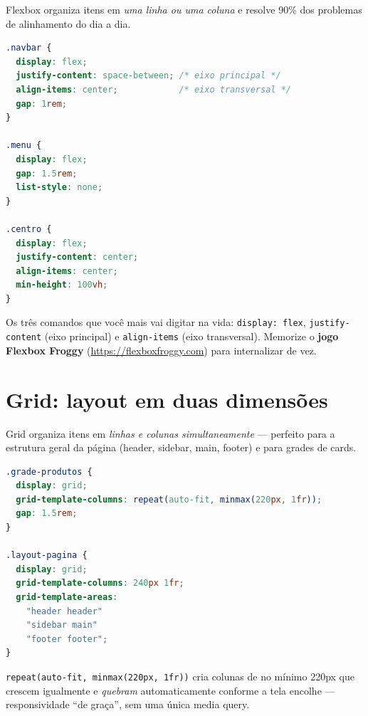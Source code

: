 Flexbox organiza itens em \emph{uma linha ou uma coluna} e resolve 90\% dos
problemas de alinhamento do dia a dia.

\begin{lstlisting}[style=livro, language=CSS,
  caption={Flexbox: centralizar e distribuir.}, label={list:css-flex}]
.navbar {
  display: flex;
  justify-content: space-between; /* eixo principal */
  align-items: center;            /* eixo transversal */
  gap: 1rem;
}

.menu {
  display: flex;
  gap: 1.5rem;
  list-style: none;
}

.centro {
  display: flex;
  justify-content: center;
  align-items: center;
  min-height: 100vh;
}
\end{lstlisting}

\begin{caixadica}
Os três comandos que você mais vai digitar na vida: \texttt{display: flex},
\texttt{justify-content} (eixo principal) e \texttt{align-items} (eixo
transversal). Memorize o \textbf{jogo Flexbox Froggy}
(\url{https://flexboxfroggy.com}) para internalizar de vez.
\end{caixadica}

\section{Grid: layout em duas dimensões}

Grid organiza itens em \emph{linhas e colunas simultaneamente} — perfeito para
a estrutura geral da página (header, sidebar, main, footer) e para grades de
cards.

\begin{lstlisting}[style=livro, language=CSS,
  caption={Grid responsivo sem media query (auto-fit + minmax).},
  label={list:css-grid}]
.grade-produtos {
  display: grid;
  grid-template-columns: repeat(auto-fit, minmax(220px, 1fr));
  gap: 1.5rem;
}

.layout-pagina {
  display: grid;
  grid-template-columns: 240px 1fr;
  grid-template-areas:
    "header header"
    "sidebar main"
    "footer footer";
}
\end{lstlisting}

\begin{caixaconceito}
\texttt{repeat(auto-fit, minmax(220px, 1fr))} cria colunas de no mínimo 220px
que crescem igualmente e \emph{quebram} automaticamente conforme a tela
encolhe — responsividade ``de graça'', sem uma única media query.
\end{caixaconceito}

